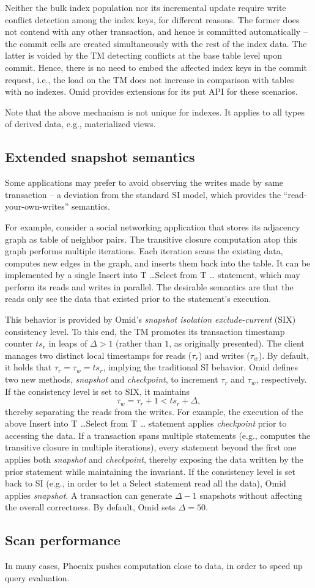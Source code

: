 Neither the bulk index population nor its incremental update require write conflict detection 
among the index keys, for different reasons. The former does not contend with any other 
transaction, and hence is committed automatically -- the commit cells are created simultaneously
with the rest of the index data. The latter is voided by the TM detecting conflicts at the base 
table level upon commit. Hence, there is no need to embed the affected index keys in the commit 
request, i.e., the load on the TM does not increase in comparison with tables with no indexes. 
Omid provides extensions for its put API for these scenarios. 

Note that the above mechanism is not unique for indexes. It applies to all types of derived data, 
e.g., materialized views. 

\subsection{Extended snapshot semantics}

Some applications may prefer to avoid observing the writes made by same transaction --
a deviation from the standard SI model, which provides the ``read-your-own-writes'' 
semantics. 

For example, consider a social networking application that stores its adjacency graph 
as table of neighbor pairs. The transitive closure computation atop this graph performs
multiple iterations. Each iteration scans the existing data, computes new edges in the 
graph, and inserts them back into the table. It can be implemented by a single 
{\sc Insert into T \ldots Select from T \ldots \/} statement, which may perform its reads and writes in parallel. 
The desirable semantics are that the reads only see the data that existed prior to the 
statement's execution. 

This behavior is provided by Omid's {\em snapshot isolation exclude-current} (SIX) 
consistency level. To this end, the TM promotes its transaction timestamp counter $ts_r$ 
in leaps of $\Delta > 1$ (rather than $1$, as originally presented).  The client manages 
two distinct local timestamps for reads ($\tau_r$) and writes ($\tau_w$). By default, 
it holds that  $\tau_r = \tau_w = ts_r$, implying the traditional SI behavior. Omid 
defines two new methods, {\em snapshot\/} and {\em checkpoint}, to increment 
$\tau_r$ and $\tau_w$, respectively. If the consistency level is set to SIX, 
it maintains 
\[
\tau_w = \tau_r+1 < ts_r+\Delta,
\]
thereby separating the reads from the writes. For example, the execution of 
the above {\sc Insert into T \ldots Select from T \ldots \/} statement applies 
{\em checkpoint\/} prior to accessing the data. If a transaction spans multiple 
statements (e.g., computes the transitive closure in multiple iterations), 
every statement beyond the first one applies both {\em snapshot\/} 
and {\em checkpoint}, thereby exposing the data written by the prior 
statement while maintaining the invariant. If the consistency level is
set back to SI (e.g., in order to let a {\sc Select\/} statement read all 
the data), Omid applies {\em snapshot\/}.  
A transaction can generate $\Delta-1$ snapshots without affecting 
the overall correctness. By default, Omid sets $\Delta=50$.  

\subsection{Scan performance} In many cases, Phoenix pushes computation close to data, in order
to speed up query evaluation.
